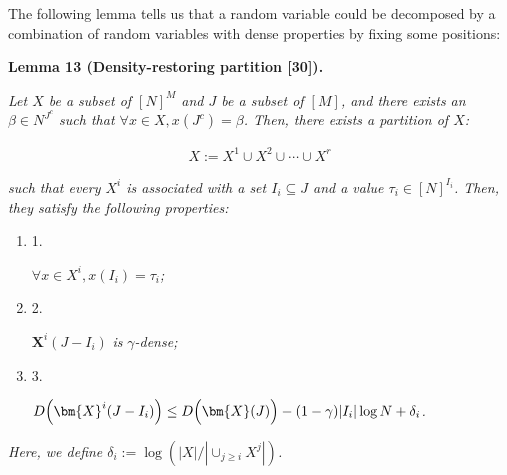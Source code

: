 \documentclass[10pt,a4paper]{article}
\begin{document}
The following lemma tells us that a random variable could be decomposed by a combination of random variables with dense properties by fixing some positions:\par





\par\medskip\noindent\textbf{
\textbf{Lemma 13}\textbf{ }(Density-restoring partition [30])\textbf{.}
}\par



\emph{Let $X$ be a subset of $[N]^{M}$ and $J$ be a subset of $[M]$, and there exists an $\beta\in N^{J^{c}}$ such that $\forall x\in X,x(J^{c})=\beta$. Then, there exists a partition of $X$:}\par


\[\begin{gathered}
X:=X^{1}\cup X^{2}\cup\cdots\cup X^{r}
\end{gathered}\]


\emph{such that every $X^{i}$ is associated with a set $I_{i}\subseteq J$ and a value $\tau_{i}\in[N]^{I_{i}}$. Then, they satisfy the following properties:}\par


\begin{enumerate}


\item[] 
1. 


$\forall x\in X^{i},x({I_{i}})=\tau_{i}$\emph{;}\par





\item[] 
2. 


$\bm{X}^{i}(J-I_{i})$\emph{ is }$\gamma$\emph{-dense;}\par





\item[] 
3. 


$D\Big{(}\bm{X}^{i}(J-I_{i})\Big{)}\leq D\Big{(}\bm{X}(J)\Big{)}-(1-\gamma)|I_{i}|\log N+\delta_{i}$\emph{.}\par





\end{enumerate}


\emph{Here, we define $\delta_{i}:=\log(|X|/|\cup_{j\geq i}X^{j}|)$.}\par
\end{document}
